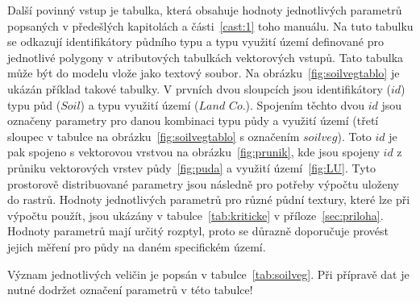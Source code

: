 Další povinný vstup je tabulka, která obsahuje hodnoty jednotlivých parametrů popsaných v předešlých kapitolách a části~\ref{cast:1} toho manuálu. Na tuto tabulku se odkazují identifikátory půdního typu a typu využití území definované pro jednotlivé polygony v atributových tabulkách vektorových vstupů. Tato tabulka může být do modelu vlože jako textový soubor. Na obrázku~\ref{fig:soilvegtablo} je ukázán příklad takové tabulky. V prvních dvou sloupcích jsou identifikátory ($id$) typu půd ($Soil$) a typu využití území ($Land$ $Co.$). Spojením těchto dvou $id$ jsou označeny parametry pro danou kombinaci typu půdy a využití území (třetí sloupec v tabulce na obrázku~\ref{fig:soilvegtablo} s označením $soilveg$). Toto $id$ je pak spojeno s vektorovou vrstvou na obrázku~\ref{fig:prunik}, kde jsou spojeny $id$ z průniku vektorových vrstev půdy~\ref{fig:puda} a využití území~\ref{fig:LU}. Tyto prostorově distribuované parametry jsou následně pro potřeby výpočtu uloženy do rastrů. Hodnoty jednotlivých parametrů pro různé půdní textury, které lze při výpočtu použít, jsou ukázány v tabulce~\ref{tab:kriticke} v příloze~\ref{sec:priloha}. Hodnoty parametrů mají určitý rozptyl, proto se důrazně doporučuje provést jejich měření pro půdy na daném specifickém území.

Význam jednotlivých veličin je popsán v tabulce~\ref{tab:soilveg}. Při přípravě dat je nutné dodržet označení parametrů v této tabulce!




